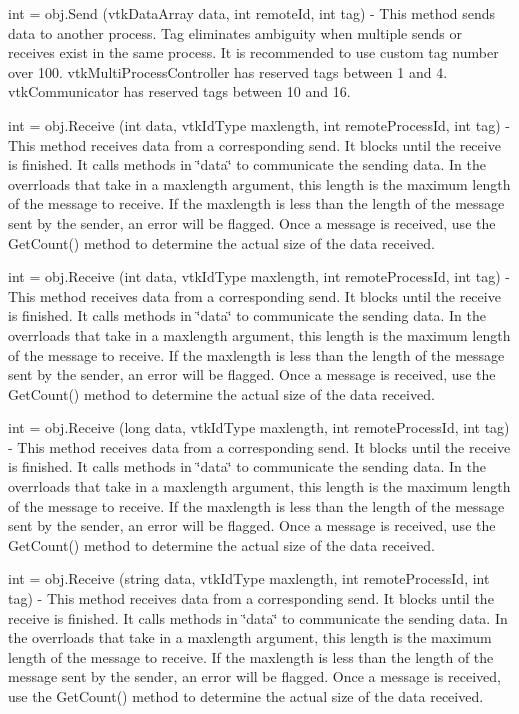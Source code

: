 \begin{DoxyItemize}
\item {\ttfamily int = obj.\-Send (vtk\-Data\-Array data, int remote\-Id, int tag)} -\/ This method sends data to another process. Tag eliminates ambiguity when multiple sends or receives exist in the same process. It is recommended to use custom tag number over 100. vtk\-Multi\-Process\-Controller has reserved tags between 1 and 4. vtk\-Communicator has reserved tags between 10 and 16.  
\item {\ttfamily int = obj.\-Receive (int data, vtk\-Id\-Type maxlength, int remote\-Process\-Id, int tag)} -\/ This method receives data from a corresponding send. It blocks until the receive is finished. It calls methods in \char`\"{}data\char`\"{} to communicate the sending data. In the overrloads that take in a {\ttfamily maxlength} argument, this length is the maximum length of the message to receive. If the maxlength is less than the length of the message sent by the sender, an error will be flagged. Once a message is received, use the Get\-Count() method to determine the actual size of the data received.  
\item {\ttfamily int = obj.\-Receive (int data, vtk\-Id\-Type maxlength, int remote\-Process\-Id, int tag)} -\/ This method receives data from a corresponding send. It blocks until the receive is finished. It calls methods in \char`\"{}data\char`\"{} to communicate the sending data. In the overrloads that take in a {\ttfamily maxlength} argument, this length is the maximum length of the message to receive. If the maxlength is less than the length of the message sent by the sender, an error will be flagged. Once a message is received, use the Get\-Count() method to determine the actual size of the data received.  
\item {\ttfamily int = obj.\-Receive (long data, vtk\-Id\-Type maxlength, int remote\-Process\-Id, int tag)} -\/ This method receives data from a corresponding send. It blocks until the receive is finished. It calls methods in \char`\"{}data\char`\"{} to communicate the sending data. In the overrloads that take in a {\ttfamily maxlength} argument, this length is the maximum length of the message to receive. If the maxlength is less than the length of the message sent by the sender, an error will be flagged. Once a message is received, use the Get\-Count() method to determine the actual size of the data received.  
\item {\ttfamily int = obj.\-Receive (string data, vtk\-Id\-Type maxlength, int remote\-Process\-Id, int tag)} -\/ This method receives data from a corresponding send. It blocks until the receive is finished. It calls methods in \char`\"{}data\char`\"{} to communicate the sending data. In the overrloads that take in a {\ttfamily maxlength} argument, this length is the maximum length of the message to receive. If the maxlength is less than the length of the message sent by the sender, an error will be flagged. Once a message is received, use the Get\-Count() method to determine the actual size of the data received.  

\end{DoxyItemize}
